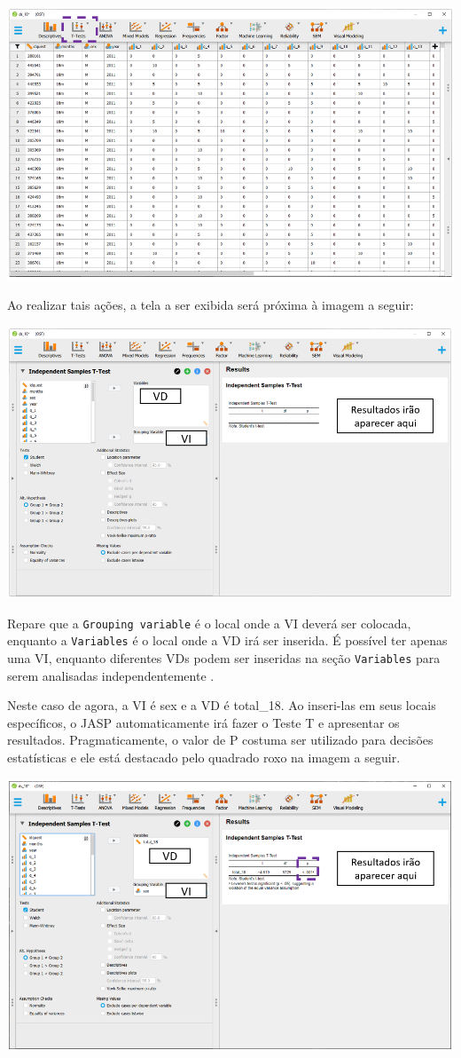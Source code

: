 \documentclass[
]{book}
\begin{document}
\includegraphics{./img/cap_testet_interface1.png}

Ao realizar tais ações, a tela a ser exibida será próxima à imagem a seguir:

\includegraphics{./img/cap_testet_interface.png}

Repare que a \texttt{Grouping\ variable} é o local onde a VI deverá ser colocada, enquanto a \texttt{Variables} é o local onde a VD irá ser inserida. É possível ter apenas uma VI, enquanto diferentes VDs podem ser inseridas na seção \texttt{Variables} para serem analisadas independentemente .

Neste caso de agora, a VI é sex e a VD é total\_18. Ao inseri-las em seus locais específicos, o JASP automaticamente irá fazer o Teste T e apresentar os resultados. Pragmaticamente, o valor de P costuma ser utilizado para decisões estatísticas e ele está destacado pelo quadrado roxo na imagem a seguir.

\includegraphics{./img/cap_testet_resultados_iniciais.png}
\end{document}
